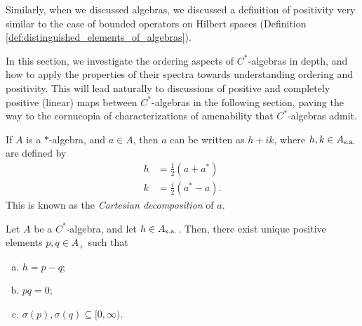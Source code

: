 Similarly, when we discussed algebras, we discussed a definition of positivity very similar to the case of bounded operators on Hilbert spaces (Definition \ref{def:distinguished_elements_of_algebras}).\newline

In this section, we investigate the ordering aspects of $C^{\ast}$-algebras in depth, and how to apply the properties of their spectra towards understanding ordering and positivity. This will lead naturally to discussions of positive and completely positive (linear) maps between $C^{\ast}$-algebras in the following section, paving the way to the cornucopia of characterizations of amenability that $C^{\ast}$-algebras admit.
\begin{definition}
  If $A$ is a $\ast$-algebra, and $a\in A$, then $a$ can be written as $h + ik$, where $h,k\in A_{\operatorname{s.a.}}$ are defined by
  \begin{align*}
    h &= \frac{1}{2}\left( a + a^{\ast} \right)\\
    k &= \frac{i}{2}\left( a^{\ast}-a \right).
  \end{align*}
  This is known as the \textit{Cartesian decomposition} of $a$.
\end{definition}
\begin{proposition}\label{prop:self_adjoint_positive_decomposition}
  Let $A$ be a $C^{\ast}$-algebra, and let $h\in A_{\operatorname{s.a.}}$. Then, there exist unique positive elements $p,q\in A_{+}$ such that
  \begin{enumerate}[(a)]
    \item $h = p-q$;
    \item $pq = 0$;
    \item $\sigma\left( p \right),\sigma\left( q \right)\subseteq [0,\infty)$.
  \end{enumerate}
\end{proposition}
